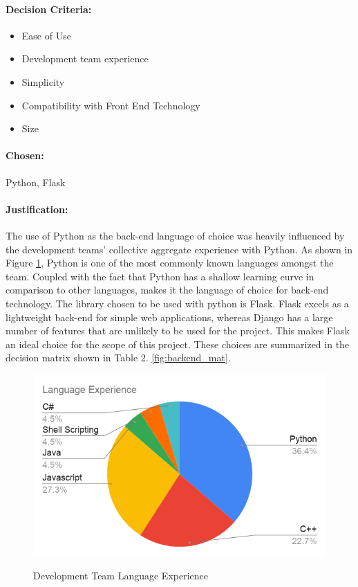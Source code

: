 \begin{spacing}{1.3}
\paragraph{Decision Criteria:}
\begin{itemize}
\item Ease of Use
\item Development team experience
\item Simplicity
\item Compatibility with Front End Technology
\item Size
\end{itemize}
\paragraph{Chosen:} Python, Flask
\paragraph{Justification:}
The use of Python as the back-end language of choice was heavily influenced by the development teams' collective aggregate experience with Python. As shown in Figure \ref{fig:lang-experience}, Python is one of the most commonly known languages amongst the team. Coupled with the fact that Python has a shallow learning curve in comparison to other languages, makes it the language of choice for back-end technology. The library chosen to be used with python is Flask. Flask excels as a lightweight back-end for simple web applications, whereas Django has a large number of features that are unlikely to be used for the project. This makes Flask an ideal choice for the scope of this project. These choices are summarized in the decision matrix shown in Table 2. \ref{fig:backend_mat}.


\begin{figure}[!h]
  \caption{Development Team Language Experience}
  \includegraphics[width=\textwidth]{images/lang-experience.png}
  \label{fig:lang-experience}
\end{figure}


\end{spacing}

